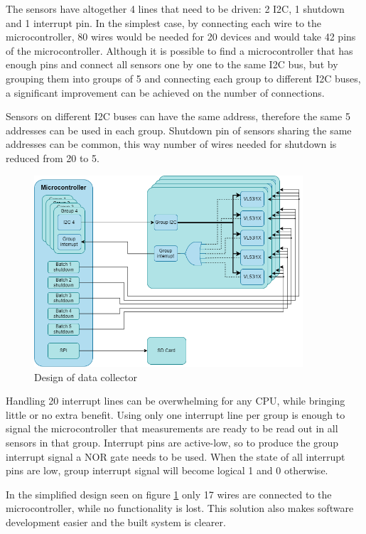 The sensors have altogether 4 lines that need to be driven: 2 I2C, 1 shutdown and 1 interrupt pin.
In the simplest case, by connecting each wire to the microcontroller, 80 wires would be needed for 
20 devices and would take 42 pins of the microcontroller. Although it is possible to find a microcontroller 
that has enough pins and connect all sensors one by one to the same I2C bus, but by grouping them 
into groups of 5 and connecting each group to different I2C buses, a significant improvement can be 
achieved on the number of connections. 

Sensors on different I2C buses can have the same address, therefore the same 5 addresses can be used
in each group. Shutdown pin of sensors sharing the same addresses can be common, this way number of
wires needed for shutdown is reduced from 20 to 5.

\begin{figure}[ht]
    \centering
    \includegraphics[width=100mm, keepaspectratio]{figures/data_collector.png}
    \caption{Design of data collector}
    \label{fig:data_collector}
\end{figure}

Handling 20 interrupt lines can be overwhelming for any CPU, while bringing little or no extra
benefit. Using only one interrupt line per group is enough to signal the microcontroller that 
measurements are ready to be read out in all sensors in that group. Interrupt pins are active-low,
so to produce the group interrupt signal a NOR gate needs to be used. When the state of all interrupt
pins are low, group interrupt signal will become logical 1 and 0 otherwise.

In the simplified design seen on figure \ref{fig:data_collector} only 17 wires are connected to
the microcontroller, while no functionality is lost. This solution also makes software development
easier and the built system is clearer.



